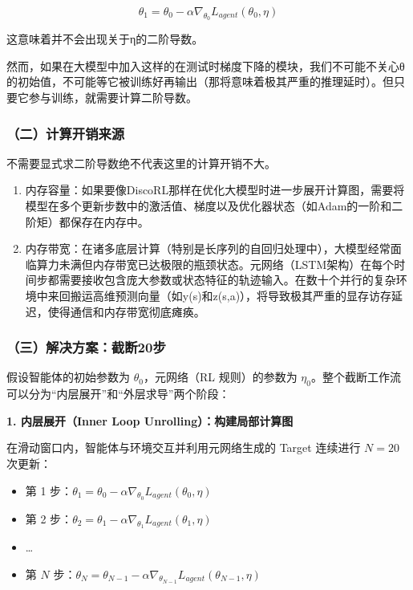 \[
\theta_1 = \theta_0 - \alpha \nabla_{\theta_0} L_{agent}(\theta_0,\eta)
\]

这意味着并不会出现关于η的二阶导数。

然而，如果在大模型中加入这样的在测试时梯度下降的模块，我们不可能不关心θ的初始值，不可能等它被训练好再输出（那将意味着极其严重的推理延时）。但只要它参与训练，就需要计算二阶导数。

\hypertarget{ux4e8cux8ba1ux7b97ux5f00ux9500ux6765ux6e90}{%
\subsubsection{（二）计算开销来源}\label{ux4e8cux8ba1ux7b97ux5f00ux9500ux6765ux6e90}}

不需要显式求二阶导数绝不代表这里的计算开销不大。

\begin{enumerate}
\def\labelenumi{\arabic{enumi}.}
\item
  内存容量：如果要像DiscoRL那样在优化大模型时进一步展开计算图，需要将模型在多个更新步数中的激活值、梯度以及优化器状态（如Adam的一阶和二阶矩）都保存在内存中。
\item
  内存带宽：在诸多底层计算（特别是长序列的自回归处理中），大模型经常面临算力未满但内存带宽已达极限的瓶颈状态。元网络（LSTM架构）在每个时间步都需要接收包含庞大参数或状态特征的轨迹输入。在数十个并行的复杂环境中来回搬运高维预测向量（如y(s)和z(s,a)），将导致极其严重的显存访存延迟，使得通信和内存带宽彻底瘫痪。
\end{enumerate}

\hypertarget{ux4e09ux89e3ux51b3ux65b9ux6848ux622aux65ad20ux6b65}{%
\subsubsection{（三）解决方案：截断20步}\label{ux4e09ux89e3ux51b3ux65b9ux6848ux622aux65ad20ux6b65}}

假设智能体的初始参数为 \(\theta_0\)，元网络（RL 规则）的参数为 \(\eta_0\)。整个截断工作流可以分为``内层展开''和``外层求导''两个阶段：

\textbf{1. 内层展开（Inner Loop Unrolling）：构建局部计算图}

在滑动窗口内，智能体与环境交互并利用元网络生成的 Target 连续进行 \(N=20\) 次更新：

\begin{itemize}
\tightlist
\item
  第 1 步：\(\theta_1 = \theta_0 - \alpha \nabla_{\theta_0} L_{agent}(\theta_0,\eta)\)
\item
  第 2 步：\(\theta_2 = \theta_1 - \alpha \nabla_{\theta_1} L_{agent}(\theta_1,\eta)\)
\item
  \ldots{}
\item
  第 \(N\) 步：\(\theta_N = \theta_{N-1} - \alpha \nabla_{\theta_{N-1}} L_{agent}(\theta_{N-1},\eta)\)
\end{itemize}

